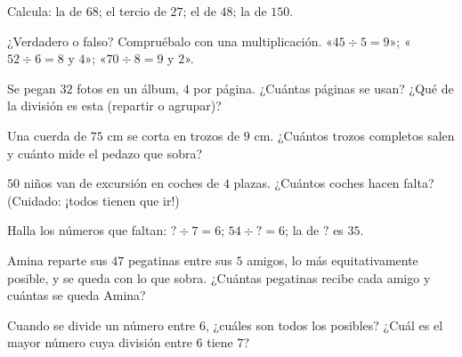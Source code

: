 \begin{exercise}[$\star$]\label{exo:g3:division:4}
Calcula: la  de $68$; el tercio de $27$; el  de $48$;
la  de $150$.
\end{exercise}

\begin{exercise}[$\star$]\label{exo:g3:division:5}
¿Verdadero o falso? Compruébalo con una multiplicación.
«$45 \div 5 = 9$»; \quad «$52 \div 6 = 8$ y  $4$»;
\quad «$70 \div 8 = 9$ y  $2$».
\end{exercise}

\begin{exercise}[$\star$]\label{exo:g3:division:6}
Se pegan $32$ fotos en un álbum, $4$ por página. ¿Cuántas páginas se
usan? ¿Qué  de la división es esta (repartir o agrupar)?
\end{exercise}

\begin{exercise}[$\star$]\label{exo:g3:division:7}
Una cuerda de $75$ cm se corta en trozos de $9$ cm. ¿Cuántos trozos completos salen
y cuánto mide el pedazo que sobra?
\end{exercise}

\begin{exercise}[$\star$]\label{exo:g3:division:8}
$50$ niños van de excursión en coches de $4$ plazas. ¿Cuántos coches hacen
falta? (Cuidado: ¡todos tienen que ir!)
\end{exercise}

\begin{exercise}[$\star$]\label{exo:g3:division:9}
Halla los números que faltan: $? \div 7 = 6$; \quad
$54 \div ? = 6$; \quad la  de $?$ es $35$.
\end{exercise}

\begin{exercise}[$\star\star$]\label{exo:g3:division:10}
Amina reparte sus $47$ pegatinas entre sus $5$ amigos, lo más equitativamente
posible, y se queda con lo que sobra. ¿Cuántas pegatinas recibe cada
amigo y cuántas se queda Amina?
\end{exercise}

\begin{exercise}[$\star\star$]\label{exo:g3:division:11}
Cuando se divide un número entre $6$, ¿cuáles son todos los
 posibles? ¿Cuál es el mayor número cuya división entre $6$ tiene
 $7$?
\end{exercise}
